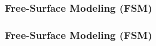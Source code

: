 \subsubsection{Free-Surface Modeling (FSM)}
\begin{frame}
\frametitle{Free-Surface Modeling (FSM)}
\end{frame}